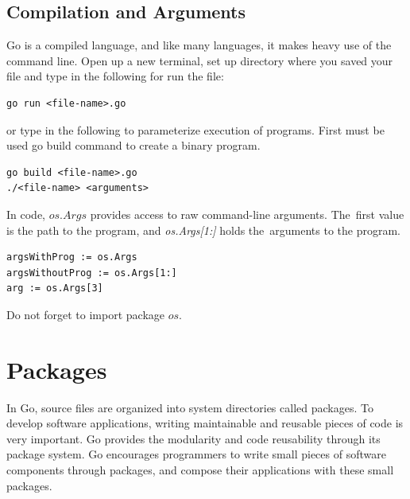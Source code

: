 \documentclass[
  twoside, 12pt, 
  printed, %
  notable,   %
  lof,     %
  lot,     %
]{fithesis3}
\begin{document}
\subsection{Compilation and Arguments}
Go is a compiled language, and like many languages, it makes heavy use of the command
line. Open up a new terminal, set up directory where you saved your file and type in the following for run the file:
\begin{lstlisting}
go run <file-name>.go
\end{lstlisting}
or type in the following to parameterize execution of programs. First must be used go build command to create a binary program.
\begin{lstlisting}
go build <file-name>.go
./<file-name> <arguments>
\end{lstlisting}
In code, $os.Args$ provides access to raw command-line arguments. The~first value is the path to the program, and \textit{os.Args[1:]} holds the~arguments to the program.
\begin{lstlisting}
argsWithProg := os.Args
argsWithoutProg := os.Args[1:]
arg := os.Args[3]
\end{lstlisting}
Do not forget to import package $os$.

\section{Packages}
In Go, source files are organized into system directories called packages. To  develop 
software applications, writing maintainable and reusable pieces of code is very important. Go 
provides the modularity and code reusability through its package system. Go encourages 
programmers to write small pieces of software components through packages, and compose their  
applications with these small packages.
\end{document}
